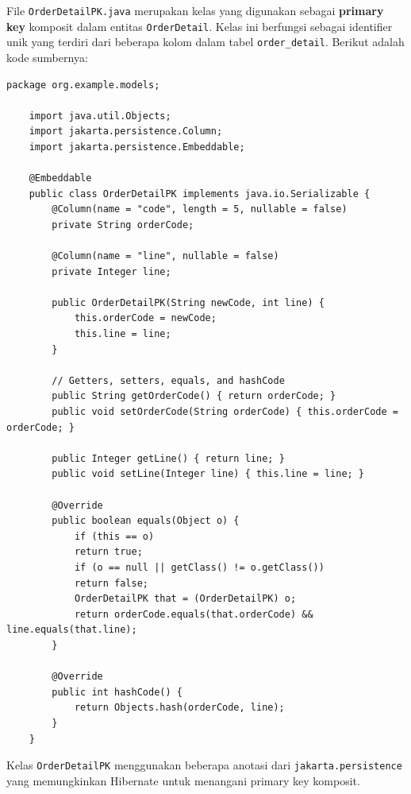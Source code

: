 File \texttt{OrderDetailPK.java} merupakan kelas yang digunakan sebagai \textbf{primary key} komposit dalam entitas \texttt{OrderDetail}. Kelas ini berfungsi sebagai identifier unik yang terdiri dari beberapa kolom dalam tabel \texttt{order\_detail}. Berikut adalah kode sumbernya:

\begin{lstlisting}[style=JavaStyle]
	package org.example.models;
	
	import java.util.Objects;
	import jakarta.persistence.Column;
	import jakarta.persistence.Embeddable;
	
	@Embeddable
	public class OrderDetailPK implements java.io.Serializable {
		@Column(name = "code", length = 5, nullable = false)
		private String orderCode;
		
		@Column(name = "line", nullable = false)
		private Integer line;
		
		public OrderDetailPK(String newCode, int line) {
			this.orderCode = newCode;
			this.line = line;
		}
		
		// Getters, setters, equals, and hashCode
		public String getOrderCode() { return orderCode; }
		public void setOrderCode(String orderCode) { this.orderCode = orderCode; }
		
		public Integer getLine() { return line; }
		public void setLine(Integer line) { this.line = line; }
		
		@Override
		public boolean equals(Object o) {
			if (this == o)
			return true;
			if (o == null || getClass() != o.getClass())
			return false;
			OrderDetailPK that = (OrderDetailPK) o;
			return orderCode.equals(that.orderCode) && line.equals(that.line);
		}
		
		@Override
		public int hashCode() {
			return Objects.hash(orderCode, line);
		}
	}
\end{lstlisting}

Kelas \texttt{OrderDetailPK} menggunakan beberapa anotasi dari \texttt{jakarta.persistence} yang memungkinkan Hibernate untuk menangani primary key komposit.

